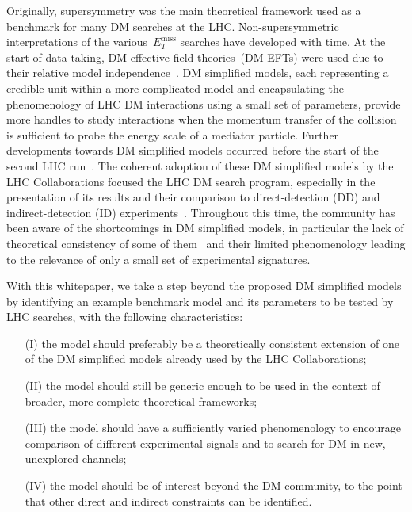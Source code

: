 \documentclass[a4paper, 11pt,notoc]{article}
\newcommand{\MET}{\ensuremath{E_T^\mathrm{miss}}\xspace}
\begin{document}
Originally, supersymmetry was the main theoretical framework used as a benchmark for many DM searches at the LHC.  Non-supersymmetric interpretations of the various~$\MET$ searches have  developed with time. At the start of data taking, DM effective field theories~(DM-EFTs)  were used due to their relative model independence~\cite{Cao:2009uw,Beltran:2010ww,Goodman:2010yf,Bai:2010hh,Goodman:2010ku,Fox:2011pm}.  DM simplified models, each representing a credible unit within a more complicated model and encapsulating the phenomenology of LHC DM interactions using a small set of parameters, provide more handles to study interactions when the momentum transfer of the collision is sufficient to probe the energy scale of a mediator particle. Further developments towards DM simplified models occurred before the start of the second LHC run~\cite{Abdallah:2015ter,Abercrombie:2015wmb}.  The coherent adoption of these DM simplified models by the LHC Collaborations focused the LHC DM search program, especially in the presentation of its results and their comparison to direct-detection (DD) and indirect-detection (ID) experiments~\cite{Boveia:2016mrp,Albert:2017onk}.  Throughout this time, the community has been aware of the shortcomings in DM simplified models, in particular the lack of theoretical consistency of some of them~\cite{Chala:2015ama,Bell:2015sza,Kahlhoefer:2015bea,Bell:2015rdw,Haisch:2016usn,Englert:2016joy,Ko:2016zxg} and their limited phenomenology leading to the relevance of only a small set of experimental signatures.  

With this whitepaper, we take a step beyond the proposed DM simplified models by identifying an example benchmark model and its parameters to be tested by LHC searches, with the following characteristics: 
\begin{itemize}
\item[(I)] the model should preferably be a theoretically consistent extension of one of the DM simplified models already used by the LHC Collaborations;
\item[(II)] the model should still be generic enough to be used in the context of broader, more complete theoretical frameworks;  
\item[(III)] the model should have a sufficiently varied phenomenology to encourage comparison of different experimental signals and to search for DM in new, unexplored channels;
\item[(IV)] the model should be of interest beyond the DM community, to the point that other direct and indirect constraints can be identified.
\end{itemize}
\end{document}
